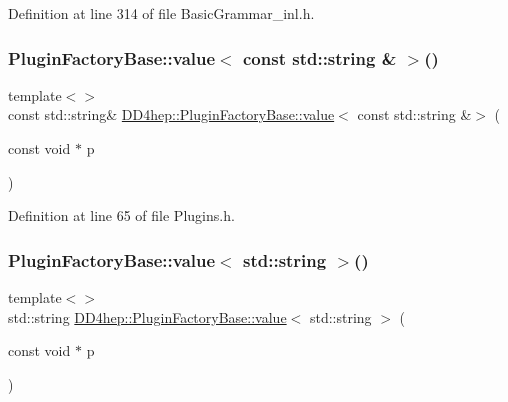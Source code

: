 Definition at line 314 of file Basic\+Grammar\+\_\+inl.\+h.

\hypertarget{namespace_d_d4hep_a1aa2a293bfef3d7c718ab8b747181709}{}\label{namespace_d_d4hep_a1aa2a293bfef3d7c718ab8b747181709} 
\subsubsection{\texorpdfstring{Plugin\+Factory\+Base\+::value$<$ const std\+::string \& $>$()}{PluginFactoryBase::value< const std::string \& >()}}
{\footnotesize\ttfamily template$<$$>$ \\
const std\+::string\& \hyperlink{struct_d_d4hep_1_1_plugin_factory_base_a7fc28aeb61b438dd2e9adcc9a6fc09b5}{D\+D4hep\+::\+Plugin\+Factory\+Base\+::value}$<$ const std\+::string \&$>$ (\begin{DoxyParamCaption}\item[{const void $\ast$}]{p }\end{DoxyParamCaption})\hspace{0.3cm}{\ttfamily [inline]}}



Definition at line 65 of file Plugins.\+h.

\hypertarget{namespace_d_d4hep_ae6577ad7f48957537cd87301f06b226e}{}\label{namespace_d_d4hep_ae6577ad7f48957537cd87301f06b226e} 
\subsubsection{\texorpdfstring{Plugin\+Factory\+Base\+::value$<$ std\+::string $>$()}{PluginFactoryBase::value< std::string >()}}
{\footnotesize\ttfamily template$<$$>$ \\
std\+::string \hyperlink{struct_d_d4hep_1_1_plugin_factory_base_a7fc28aeb61b438dd2e9adcc9a6fc09b5}{D\+D4hep\+::\+Plugin\+Factory\+Base\+::value}$<$ std\+::string $>$ (\begin{DoxyParamCaption}\item[{const void $\ast$}]{p }\end{DoxyParamCaption})\hspace{0.3cm}{\ttfamily [inline]}}




